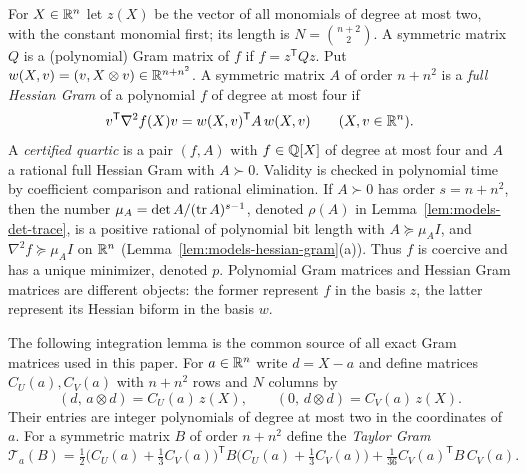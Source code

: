 For $X\in\mathbb R^n$ let $z(X)$ be the vector of all monomials of degree at most two,
with the constant monomial first; its length is $N=\binom{n+2}{2}$. A
symmetric matrix $Q$ is a (polynomial) Gram matrix of $f$ if
$f=z^{\mathsf T}Qz$. Put $w(X,v)=(v,X\otimes v)\in\mathbb R^{n+n^2}$. A symmetric
matrix $A$ of order $n+n^2$ is a \emph{full Hessian Gram} of a polynomial $f$
of degree at most four if
\begin{equation}
 v^{\mathsf T}\nabla^2f(X)v=w(X,v)^{\mathsf T}A\,w(X,v)
 \qquad(X,v\in\mathbb R^n).
 \label{eq:heights-hessian-gram}
\end{equation}
A \emph{certified quartic} is a pair $(f,A)$ with $f\in\mathbb Q[X]$ of degree at
most four and $A$ a rational full Hessian Gram with $A\succ0$. Validity is
checked in polynomial time by coefficient comparison and rational
elimination. If $A\succ0$ has order $s=n+n^2$, then the number
$\mu_A=\det A/(\operatorname{tr} A)^{s-1}$, denoted $\rho(A)$ in
Lemma~\ref{lem:models-det-trace}, is a positive rational of polynomial bit
length with $A\succeq\mu_AI$, and
$\nabla^2f\succeq\mu_AI$ on $\mathbb R^n$
(Lemma~\ref{lem:models-hessian-gram}(a)). Thus $f$ is coercive and has a unique
minimizer, denoted $p$. Polynomial Gram matrices and Hessian Gram matrices
are different objects: the former represent $f$ in the basis $z$, the latter
represent its Hessian biform in the basis $w$.

The following integration lemma is the common source of all exact Gram
matrices used in this paper. For $a\in\mathbb R^n$ write $d=X-a$ and define matrices
$C_U(a),C_V(a)$ with $n+n^2$ rows and $N$ columns by
\[
 (d,\,a\otimes d)=C_U(a)\,z(X),\qquad (0,\,d\otimes d)=C_V(a)\,z(X).
\]
Their entries are integer polynomials of degree at most two in the
coordinates of $a$. For a symmetric matrix $B$ of order $n+n^2$ define the
\emph{Taylor Gram}
\begin{equation}
 \mathcal T_a(B)=\tfrac12\bigl(C_U(a)+\tfrac13C_V(a)\bigr)^{\mathsf T}B
          \bigl(C_U(a)+\tfrac13C_V(a)\bigr)
   +\tfrac1{36}C_V(a)^{\mathsf T}B\,C_V(a).
 \label{eq:heights-taylor-gram}
\end{equation}

